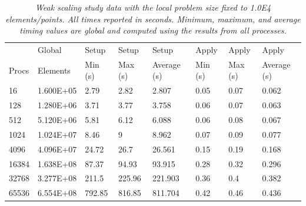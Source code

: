 \documentclass{mc2013}
\begin{document}
\begin{table}[htpb!]
  \begin{center}
    \begin{tabular}{llllllll}\hline\hline
      \multicolumn{1}{l}{} & 
      \multicolumn{1}{l}{Global} & 
      \multicolumn{1}{l}{Setup} & 
      \multicolumn{1}{l}{Setup} & 
      \multicolumn{1}{l}{Setup} & 
      \multicolumn{1}{l}{Apply} & 
      \multicolumn{1}{l}{Apply} & 
      \multicolumn{1}{l}{Apply}\\
      \multicolumn{1}{l}{Procs} & 
      \multicolumn{1}{l}{Elements} & 
      \multicolumn{1}{l}{Min (s)} & 
      \multicolumn{1}{l}{Max (s)} & 
      \multicolumn{1}{l}{Average (s)} & 
      \multicolumn{1}{l}{Min (s)} & 
      \multicolumn{1}{l}{Max (s)} & 
      \multicolumn{1}{l}{Average (s)}\\ \hline\hline
16 &	1.600E+05 & 2.79 &	2.82 &	  2.807 &	0.05 & 0.07 &	0.062 \\
128 &	1.280E+06 & 3.71 &	3.77 &	  3.758 &	0.06 &	0.07 &	0.063 \\
512 &	5.120E+06 & 5.81 &	6.12 &	  6.088 &	0.06 &	0.08 &	0.067 \\
1024 &	1.024E+07 & 8.46 &	9 &       8.962 &	0.07 &	0.09 &	0.077 \\
4096 &	4.096E+07 & 24.72 &	26.7 &	  26.561 &	0.15 &	0.19 &	0.168 \\
16384 &	1.638E+08 & 87.37 &	94.93 &	  93.915 &	0.28 &	0.32 &	0.296 \\
32768 &	3.277E+08 & 211.5 &	225.96 &  221.903 &	0.36 &	0.4 &	0.382 \\
65536 &	6.554E+08 & 792.85 & 816.85	& 811.704 &	0.42 &	0.46 &	0.436 \\
      \hline\hline
    \end{tabular}
  \end{center}
  \caption{\sl Weak scaling study data with the local problem size
    fixed to 1.0E4 elements/points. All times reported in
    seconds. Minimum, maximum, and average timing values are global
    and computed using the results from all processes.}
  \label{tab:weak_scaling}
\end{table}
\end{document}
